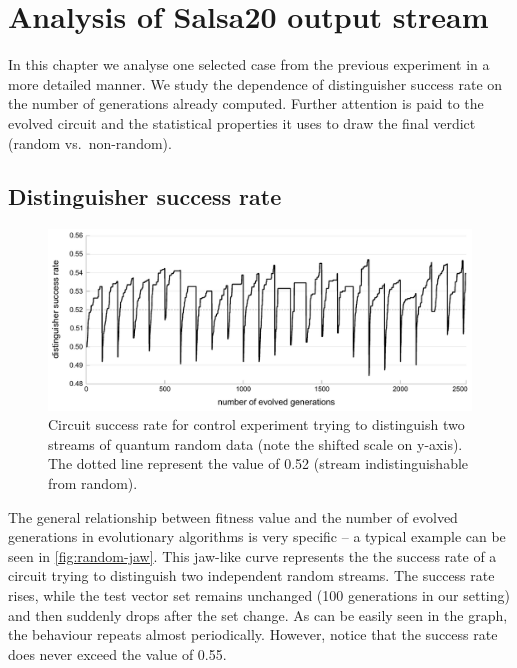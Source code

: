 \documentclass[12pt,oneside]{fithesis2}		%
\renewcommand{\_}{\leavevmode \kern0.0em\vbox{\hrule width0.4em}}
\begin{document}
\chapter{Analysis of Salsa20 output stream}
\label{chap:analysis-salsa}

In this chapter we analyse one selected case from the previous experiment in a more detailed manner.
We study the dependence of distinguisher success rate on the number of generations already computed.
Further attention is paid to the evolved circuit and the statistical properties it uses to draw the final verdict
(random vs.\ non-random).

\section{Distinguisher success rate}
\label{sec:salsa-success-rate}

\begin{figure}[b!]
\centering
\includegraphics[width=\textwidth]{images/jaw-random}
\caption{Circuit success rate for control experiment trying to distinguish two streams of quantum random data (note the shifted 
scale on y-axis). The dotted line represent the value of 0.52 (stream indistinguishable from random).}
\label{fig:random-jaw}
\end{figure}

The general relationship between fitness value and the number of evolved generations in evolutionary algorithms is very specific -- 
a typical example can be seen in \autoref{fig:random-jaw}. This jaw-like curve represents the the success rate of a circuit trying
to distinguish two independent random streams. The success rate rises, while the test vector set remains unchanged (100 generations
in our setting) and then suddenly drops after the set change. As can be easily seen in the graph, the behaviour repeats 
almost periodically. However, notice that the success rate does never exceed the value of 0.55.
\end{document}
